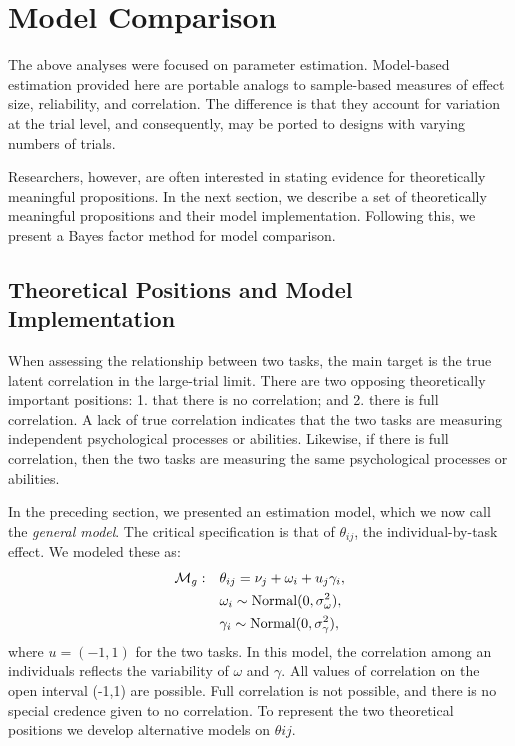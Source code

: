 \documentclass[english,man]{apa6}
\theoremstyle{definition}
\theoremstyle{definition}
\theoremstyle{definition}
\theoremstyle{remark}
\begin{document}
\section{Model Comparison}\label{model-comparison}

The above analyses were focused on parameter estimation. Model-based
estimation provided here are portable analogs to sample-based measures
of effect size, reliability, and correlation. The difference is that
they account for variation at the trial level, and consequently, may be
ported to designs with varying numbers of trials.

Researchers, however, are often interested in stating evidence for
theoretically meaningful propositions. In the next section, we describe
a set of theoretically meaningful propositions and their model
implementation. Following this, we present a Bayes factor method for
model comparison.

\subsection{Theoretical Positions and Model
Implementation}\label{theoretical-positions-and-model-implementation}

When assessing the relationship between two tasks, the main target is
the true latent correlation in the large-trial limit. There are two
opposing theoretically important positions: 1. that there is no
correlation; and 2. there is full correlation. A lack of true
correlation indicates that the two tasks are measuring independent
psychological processes or abilities. Likewise, if there is full
correlation, then the two tasks are measuring the same psychological
processes or abilities.

In the preceding section, we presented an estimation model, which we now
call the \emph{general model}. The critical specification is that of
\(\theta_{ij}\), the individual-by-task effect. We modeled these as:
\[ \begin{aligned}
{\cal M}_g: \quad & \theta_{ij}=\nu_j+\omega_i+u_j\gamma_i,\\
& \omega_i \sim \mbox{Normal}(0,\sigma^2_\omega),\\
& \gamma_i \sim \mbox{Normal}(0,\sigma^2_\gamma),
\end{aligned}
\] where \(u=(-1,1)\) for the two tasks. In this model, the correlation
among an individuals reflects the variability of \(\omega\) and
\(\gamma\). All values of correlation on the open interval (-1,1) are
possible. Full correlation is not possible, and there is no special
credence given to no correlation. To represent the two theoretical
positions we develop alternative models on \(\theta{ij}\).
\end{document}
